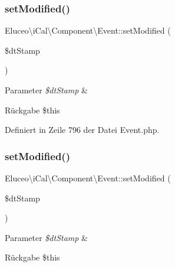\subsubsection{\texorpdfstring{set\+Modified()}{setModified()}\hspace{0.1cm}{\footnotesize\ttfamily [2/3]}}
{\footnotesize\ttfamily Eluceo\textbackslash{}i\+Cal\textbackslash{}\+Component\textbackslash{}\+Event\+::set\+Modified (\begin{DoxyParamCaption}\item[{}]{\$dt\+Stamp }\end{DoxyParamCaption})}


\begin{DoxyParams}{Parameter}
{\em \$dt\+Stamp} & \\
\hline
\end{DoxyParams}
\begin{DoxyReturn}{Rückgabe}
\$this 
\end{DoxyReturn}


Definiert in Zeile 796 der Datei Event.\+php.

\mbox{\label{class_eluceo_1_1i_cal_1_1_component_1_1_event_aaebe7c920032e1ea1025db235c9d2003}} 
\subsubsection{\texorpdfstring{set\+Modified()}{setModified()}\hspace{0.1cm}{\footnotesize\ttfamily [3/3]}}
{\footnotesize\ttfamily Eluceo\textbackslash{}i\+Cal\textbackslash{}\+Component\textbackslash{}\+Event\+::set\+Modified (\begin{DoxyParamCaption}\item[{}]{\$dt\+Stamp }\end{DoxyParamCaption})}


\begin{DoxyParams}{Parameter}
{\em \$dt\+Stamp} & \\
\hline
\end{DoxyParams}
\begin{DoxyReturn}{Rückgabe}
\$this 
\end{DoxyReturn}


